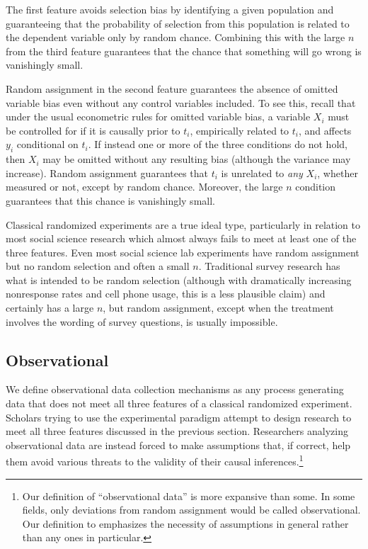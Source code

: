 \documentclass[11pt,titlepage]{article}
\begin{document}
The first feature avoids selection bias by identifying a given
population and guaranteeing that the probability of selection from
this population is related to the dependent variable only by random
chance.  Combining this with the large $n$ from the third feature
guarantees that the chance that something will go wrong is vanishingly
small.

Random assignment in the second feature guarantees the absence of
omitted variable bias even without any control variables included.  To
see this, recall that under the usual econometric rules for omitted
variable bias, a variable $X_i$ must be controlled for if it is
causally prior to $t_i$, empirically related to $t_i$, and affects
$y_i$ conditional on $t_i$.  If instead one or more of the three
conditions do not hold, then $X_i$ may be omitted without any
resulting bias (although the variance may increase).  Random
assignment guarantees that $t_i$ is unrelated to \emph{any} $X_i$,
whether measured or not, except by random chance.  Moreover, the large
$n$ condition guarantees that this chance is vanishingly small.

Classical randomized experiments are a true ideal type, particularly
in relation to most social science research which almost always fails
to meet at least one of the three features.  Even most social science
lab experiments have random assignment but no random selection and
often a small $n$.  Traditional survey research has what is intended
to be random selection (although with dramatically increasing
nonresponse rates and cell phone usage, this is a less plausible
claim) and certainly has a large $n$, but random assignment, except
when the treatment involves the wording of survey questions, is
usually impossible.

\subsection{Observational}

We define observational data collection mechanisms as any process
generating data that does not meet all three features of a classical
randomized experiment.  Scholars trying to use the experimental
paradigm attempt to design research to meet all three features
discussed in the previous section.  Researchers analyzing
observational data are instead forced to make assumptions that, if
correct, help them avoid various threats to the validity of their
causal inferences.\footnote{Our definition of ``observational data''
  is more expansive than some.  In some fields, only deviations from
  random assignment would be called observational.  Our definition to
  emphasizes the necessity of assumptions in general rather than any
  ones in particular.}
\end{document}
